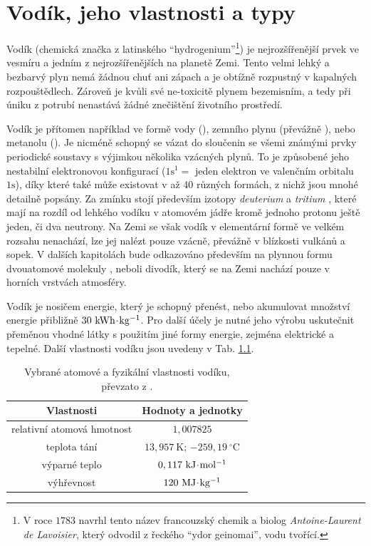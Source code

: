 \chapter{Vodík, jeho vlastnosti a typy}

Vodík (chemická značka  z latinského \enquote{hydrogenium}\footnote{V roce $1783$ navrhl tento název francouzský chemik a biolog \textit{Antoine-Laurent de Lavoisier}, který odvodil z řeckého \enquote{ydor geinomai}, vodu tvořící.}) je nejrozšířenější prvek ve vesmíru a jedním z nejrozšířenějších na planetě Zemi. Tento velmi lehký a bezbarvý plyn nemá žádnou chuť ani zápach a je obtížně rozpustný v kapalných rozpouštědlech. Zároveň je kvůli své ne-toxicitě plynem bezemisním, a tedy při úniku z potrubí nenastává žádné znečištění životního prostředí. \cite{Greenwood1993}

Vodík je přítomen například ve formě vody (), zemního plynu (převážně ), nebo metanolu (). Je nicméně schopný se vázat do sloučenin se všemi známými prvky periodické soustavy s výjimkou několika vzácných plynů. To je způsobené jeho nestabilní elektronovou konfigurací ($1\mathrm{s}^1 =$ jeden elektron ve valenčním orbitalu $1\mathrm{s}$), díky které také může existovat v až 40 různých formách, z nichž jsou mnohé detailně popsány. Za zmínku stojí především izotopy \textit{deuterium}  a \textit{tritium} , které mají na rozdíl od lehkého vodíku  v atomovém jádře kromě jednoho protonu ještě jeden, či dva neutrony. Na Zemi se však vodík v elementární formě ve velkém rozsahu nenachází, lze jej nalézt pouze vzácně, převážně v blízkosti vulkánů a sopek. V dalších kapitolách bude odkazováno především na plynnou formu dvouatomové molekuly , neboli divodík, který se na Zemi nachází pouze v horních vrstvách atmosféry. \cite{Greenwood1993}

Vodík je nosičem energie, který je schopný přenést, nebo akumulovat množství energie přibližně $30\ \mathrm{kWh\krat kg^{-1}}$. \cite{Hytep} Pro další účely je nutné jeho výrobu uskutečnit přeměnou vhodné látky s použitím jiné formy energie, zejména elektrické a tepelné. \cite{Kadrnozka2006} Další vlastnosti vodíku jsou uvedeny v Tab. \ref{tab:vlastnosti_vodiku}.
\begin{table}[h]
    \centering
    \begin{tabular}{|c|c|}
        \hline
        \textbf{Vlastnosti} & \textbf{Hodnoty a jednotky} \\ \hline\hline
        relativní atomová hmotnost & $1,007825$ \\ \hline
        teplota tání & $13,957\ \mathrm{K}$; $-259,19\ \mathrm{^{\circ}C}$ \\ \hline
        výparné teplo & $0,117\ \mathrm{kJ\krat mol^{-1}}$ \\ \hline
        výhřevnost & $120\ \mathrm{MJ\krat kg^{-1}}$ \\ \hline
    \end{tabular}
    \caption[Vybrané atomové a fyzikální vlastnosti vodíku]{Vybrané atomové a fyzikální vlastnosti vodíku, převzato z \cite{Greenwood1993}.}
    \label{tab:vlastnosti_vodiku}
\end{table}


